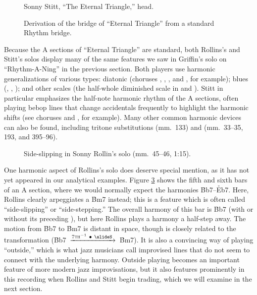 \begin{figure}[tbp]
  \caption{Sonny Stitt, ``The Eternal Triangle,'' head.}
  \label{et:head-melody}
\end{figure}


\begin{figure}[tbp]
  \caption{Derivation of the bridge of ``Eternal Triangle'' from a standard
    Rhythm bridge.}
  \label{et:bridge-derivation}
\end{figure}

Because the A sections of ``Eternal Triangle'' are standard, both Rollins's
and Stitt's solos display many of the same features we saw in Griffin's solo
on ``Rhythm-A-Ning'' in the previous section. Both players use harmonic
generalizations of various types: diatonic (choruses , ,
, and , for example); blues (, ,
); and other scales (the half-whole diminished scale in
 and ). Stitt in particular emphasizes the half-note
harmonic rhythm of the A sections, often playing bebop lines that change
accidentals frequently to highlight the harmonic shifts (see choruses
 and , for example). Many other common harmonic devices
can also be found, including tritone substitutions (mm.~133) and 
(mm.~33--35, 193, and 395--96).

\begin{figure}[tbp]
  \vspace{1em}
  \caption[Side-slipping in Sonny Rollin's solo.]{%
    Side-slipping in Sonny Rollin's solo (mm.~45--46, 1:15).}
  \label{et:sr-side-slipping}
\end{figure}

One harmonic aspect of Rollins's solo does deserve special mention, as it has
not yet appeared in our analytical examples. Figure \ref{et:sr-side-slipping}
shows the fifth and sixth bars of an A section, where we would normally expect
the harmonies \h{Bb7}--\h{Eb7}. Here, Rollins clearly arpeggiates a \h{Bm7}
instead; this is a feature which is often called ``side-slipping'' or
``side-stepping.'' The overall harmony of this bar is \h{Bb7} (with
or without its preceding \ii), but here Rollins plays a harmony a half-step
away. The motion from \h{Bb7} to \h{Bm7} is distant in \tf space, though is
closely related to the \slideS transformation \mbox{(\h{Bb7}
  $\xrightarrow{7\text{\textsc{th}}^{-1}\ \bullet\ \text{\slideS}\,}$
  \h{Bm7})}. It is also a convincing way of playing ``outside,''
which is what jazz musicians call improvised lines that do not seem to connect
with the underlying harmony. Outside playing becomes an important
feature of more modern jazz improvisations, but it also features prominently
in this recording when Rollins and Stitt begin trading, which we will examine
in the next section.

